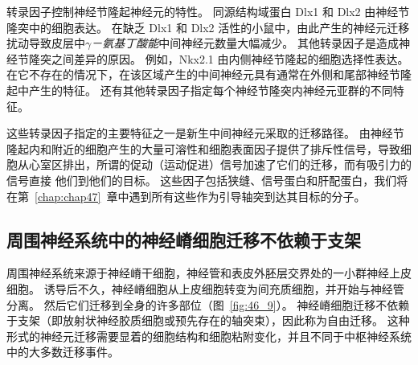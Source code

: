 转录因子控制神经节隆起神经元的特性。
同源结构域蛋白 Dlx1 和 Dlx2 由神经节隆突中的细胞表达。
在缺乏 Dlx1 和 Dlx2 活性的小鼠中，由此产生的神经元迁移扰动导致皮层中\textit{$\gamma$－氨基丁酸能}中间神经元数量大幅减少。
其他转录因子是造成神经节隆突之间差异的原因。
例如，Nkx2.1 由内侧神经节隆起的细胞选择性表达。
在它不存在的情况下，在该区域产生的中间神经元具有通常在外侧和尾部神经节隆起中产生的特征。
还有其他转录因子指定每个神经节隆突内神经元亚群的不同特征。


这些转录因子指定的主要特征之一是新生中间神经元采取的迁移路径。
由神经节隆起内和附近的细胞产生的大量可溶性和细胞表面因子提供了排斥性信号，导致细胞从心室区排出，所谓的促动（运动促进）信号加速了它们的迁移，而有吸引力的信号直接 他们到他们的目标。
这些因子包括狭缝、信号蛋白和肝配蛋白，我们将在第~\ref{chap:chap47}~章中遇到所有这些作为引导轴突到达其目标的分子。



\subsection{周围神经系统中的神经嵴细胞迁移不依赖于支架}

周围神经系统来源于神经嵴干细胞，神经管和表皮外胚层交界处的一小群神经上皮细胞。
诱导后不久，神经嵴细胞从上皮细胞转变为间充质细胞，并开始与神经管分离。
然后它们迁移到全身的许多部位（图~\ref{fig:46_9}）。
神经嵴细胞迁移不依赖于支架（即放射状神经胶质细胞或预先存在的轴突束），因此称为自由迁移。
这种形式的神经元迁移需要显着的细胞结构和细胞粘附变化，并且不同于中枢神经系统中的大多数迁移事件。


